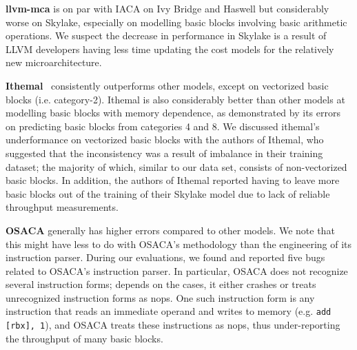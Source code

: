 \textbf{llvm-mca} is on par with IACA on Ivy Bridge and Haswell but considerably worse on Skylake,
especially on modelling basic blocks involving basic arithmetic operations.
We suspect the decrease in performance in Skylake is a result of LLVM developers 
having less time updating the cost models for the relatively new microarchitecture.

\textbf{Ithemal}~\cite{ithemal} consistently outperforms other models, except on vectorized basic blocks (i.e. category-2).
Ithemal is also considerably better than other models at modelling basic blocks with memory dependence,
as demonstrated by its errors on predicting basic blocks from categories 4 and 8.
We discussed ithemal's underformance on vectorized basic blocks with the authors of Ithemal, who suggested that the inconsistency
was a result of imbalance in their training dataset;
the majority of which, similar to our data set, consists of non-vectorized basic blocks.
In addition, the authors of Ithemal reported having to leave more basic blocks out of the training of their
Skylake model due to lack of reliable throughput measurements.

\textbf{OSACA}\cite{osaca} generally has higher errors compared to other models.
We note that this might have less to do with OSACA's methodology than the engineering of its instruction parser.
During our evaluations, we found and reported five bugs related to OSACA's instruction parser.
In particular, OSACA does not recognize several instruction forms;
depends on the cases, it either crashes or treats unrecognized instruction forms as nops.
One such instruction form is any instruction that reads an immediate operand and writes to memory
(e.g. \verb|add [rbx], 1|), and OSACA treats these instructions as nops, thus under-reporting the throughput of
many basic blocks.


